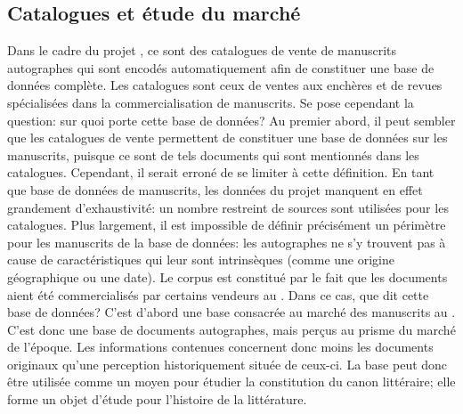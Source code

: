 \subsection{Catalogues et étude du marché}
Dans le cadre du projet \mssktb{}, ce sont des catalogues de vente de manuscrits autographes qui sont encodés automatiquement afin de constituer une base de données complète. Les catalogues sont ceux de ventes aux enchères et de revues spécialisées dans la commercialisation de manuscrits. Se pose cependant la question: sur quoi porte cette base de données? Au premier abord, il peut sembler que les catalogues de vente permettent de constituer une base de données sur les manuscrits, puisque ce sont de tels documents qui sont mentionnés dans les catalogues. Cependant, il serait erroné de se limiter à cette définition. En tant que base de données de manuscrits, les données du projet \ktb{} manquent en effet grandement d'exhaustivité: un nombre restreint de sources sont utilisées pour les catalogues. Plus largement, il est impossible de définir précisément un périmètre pour les manuscrits de la base de données: les autographes ne s'y trouvent pas à cause de caractéristiques qui leur sont intrinsèques (comme une origine géographique ou une date). Le corpus est constitué par le fait que les documents aient été commercialisés par certains vendeurs au . Dans ce cas, que dit cette base de données? C'est d'abord une base consacrée au marché des manuscrits au . C'est donc une base de documents autographes, mais perçus au prisme du marché de l'époque. Les informations contenues concernent donc moins les documents originaux qu'une perception historiquement située de ceux-ci. La base peut donc être utilisée comme un moyen pour étudier la constitution du canon littéraire; elle forme un objet d'étude pour l'histoire de la littérature.

